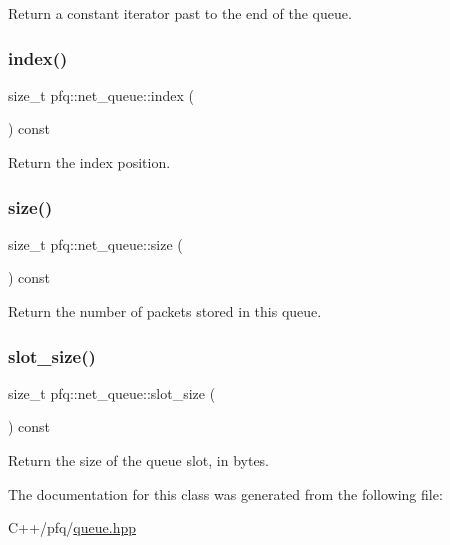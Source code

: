 Return a constant iterator past to the end of the queue. 

\mbox{\label{classpfq_1_1net__queue_a6f328cf50f038056f2b761bfaeca4c91}} 
\subsubsection{\texorpdfstring{index()}{index()}}
{\footnotesize\ttfamily size\+\_\+t pfq\+::net\+\_\+queue\+::index (\begin{DoxyParamCaption}{ }\end{DoxyParamCaption}) const\hspace{0.3cm}{\ttfamily [inline]}}



Return the index position. 

\mbox{\label{classpfq_1_1net__queue_a09cfe8a0ca2c9d11191ce9a8186adedd}} 
\subsubsection{\texorpdfstring{size()}{size()}}
{\footnotesize\ttfamily size\+\_\+t pfq\+::net\+\_\+queue\+::size (\begin{DoxyParamCaption}{ }\end{DoxyParamCaption}) const\hspace{0.3cm}{\ttfamily [inline]}}



Return the number of packets stored in this queue. 

\mbox{\label{classpfq_1_1net__queue_a29b652b2c4e672bdfe65709483ad4319}} 
\subsubsection{\texorpdfstring{slot\+\_\+size()}{slot\_size()}}
{\footnotesize\ttfamily size\+\_\+t pfq\+::net\+\_\+queue\+::slot\+\_\+size (\begin{DoxyParamCaption}{ }\end{DoxyParamCaption}) const\hspace{0.3cm}{\ttfamily [inline]}}



Return the size of the queue slot, in bytes. 



The documentation for this class was generated from the following file\+:\begin{DoxyCompactItemize}
\item 
C++/pfq/\hyperlink{queue_8hpp}{queue.\+hpp}\end{DoxyCompactItemize}
